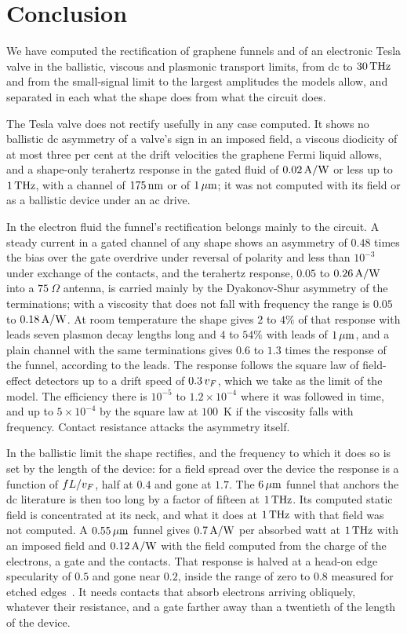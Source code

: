 \section{Conclusion}
\label{sec:conclusion}

We have computed the rectification of graphene funnels and of an
electronic Tesla valve in the ballistic, viscous and plasmonic transport
limits, from dc to $30\,\mathrm{THz}$ and from the small-signal limit to the largest
amplitudes the models allow,
and separated in each what the shape does from what the circuit does.

The Tesla valve does not rectify usefully in any case computed. It shows
no ballistic dc asymmetry of a valve's sign in an imposed field, a
viscous diodicity of at most three per cent at the drift velocities the
graphene Fermi liquid allows, and a shape-only terahertz response in the
gated fluid of $0.02\,\mathrm{A/W}$ or less up to $1\,\mathrm{THz}$, with a channel of
$175\,\mathrm{nm}$ or of $1\,\mu\mathrm{m}$; it was not computed with its field or as a
ballistic device under an ac drive.

In the electron fluid the funnel's rectification belongs mainly to the
circuit. A steady current in a gated channel of any shape shows an
asymmetry of $0.48$ times the bias over the gate overdrive under reversal
of polarity and less than $10^{-3}$ under exchange of the contacts, and
the terahertz response, $0.05$ to $0.26\,\mathrm{A/W}$ into a $75\ \Omega$ antenna,
is carried mainly by the Dyakonov-Shur asymmetry of the terminations;
with a viscosity that does not fall with frequency the range is $0.05$ to
$0.18\,\mathrm{A/W}$. At room temperature the shape gives $2$ to $4\%$ of that
response with leads seven plasmon decay lengths long and $4$ to $54\%$
with leads of $1\,\mu\mathrm{m}$, and a plain channel with the same terminations
gives $0.6$ to $1.3$ times the response of the funnel, according to the
leads. The response follows the square law of
field-effect detectors up to a drift speed of $0.3\,v_{F}$, which we take
as the limit of the model. The efficiency there is $10^{-5}$ to
$1.2\times10^{-4}$ where it was followed in time, and up to
$5\times10^{-4}$ by the square law at $100$~K if the viscosity falls with
frequency. Contact resistance attacks the asymmetry itself.

In the ballistic limit the shape rectifies, and the frequency to which it
does so is set by the length of the device: for a field spread over the
device the response is a function of $fL/v_{F}$, half at $0.4$ and gone at
$1.7$. The $6\,\mu\mathrm{m}$ funnel that anchors the dc literature is then too long
by a factor of fifteen at $1\,\mathrm{THz}$. Its computed static field is
concentrated at its neck, and what it does at $1\,\mathrm{THz}$ with that field
was not computed. A $0.55\,\mu\mathrm{m}$ funnel gives $0.7\,\mathrm{A/W}$ per absorbed watt at
$1\,\mathrm{THz}$ with an imposed field and $0.12\,\mathrm{A/W}$ with the field computed from
the charge of the electrons, a gate and the contacts. That response is
halved at a head-on edge specularity of $0.5$ and gone near $0.2$, inside
the range of zero to $0.8$ measured for etched
edges~\cite{taychatanapat2013electrically,masubuchi2012boundary,barnard2017absorptive,berdyugin2020minibands}.
It needs contacts that absorb electrons arriving obliquely, whatever
their resistance, and a gate farther away than a twentieth of the length
of the device.

